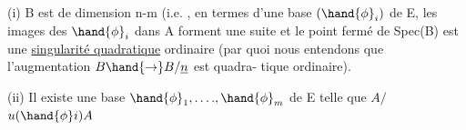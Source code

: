  (i) B est de dimension n-m (i.e. , en termes d'une base  $(\hand{\phi}_i)$ de
\margin{$\|$} E, les images des $\hand{\phi}_i$ dans A forment une suite  et  le
 point fermé de Spec(B) est une \uline{singularité quadratique}
ordinaire (par quoi nous entendons que l'augmentation $B\hand{\to} B/\underline{n}$ est  quadra-%
tique ordinaire).

(ii) Il existe une base $\hand{\phi}_1 ,\ldots., \hand{\phi}_m$ de E telle que $A/$$u(\hand{\phi} i)A$

